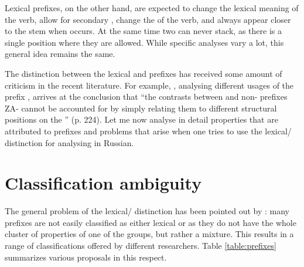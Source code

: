 Lexical prefixes, on the other hand, are expected to change the lexical meaning of the verb, allow for secondary , change the  of the verb, and always appear closer to the stem when  occurs. At the same time two  can never stack, as there is a single position where they are allowed. While specific analyses vary a lot, this general idea remains the same. 

The distinction between the lexical and  prefixes has received some amount of criticism in the recent literature. For example, \citet{Braginsky:08}, analysing different usages of the prefix , arrives at the conclusion that ``the contrasts
between  and non- prefixes ZA- cannot be accounted for by
simply relating them to different structural positions on the '' (p. 224). Let me now analyse in detail properties that are attributed to  prefixes and problems that arise when one tries to use the lexical/ distinction for analysing  in Russian.


\section{Classification ambiguity}\label{section:classification}
The general problem of the lexical/ distinction has been pointed out by \citet[32]{Kagan:book}: many prefixes are not easily classified as either lexical or  as they do not have the whole cluster of properties of one of the groups, but rather a mixture. This results in a range of classifications offered by different researchers. Table \ref{table:prefixes} summarizes various proposals in this respect.


